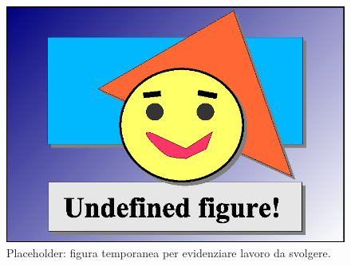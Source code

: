 


\begin{figure}[!hbp]
\begin{center}
\includegraphics{images/placeholder.eps}
\caption[~placeholder]{Placeholder: figura temporanea per
evidenziare lavoro da svolgere.} \label{fig:placeholder}
\end{center}
\end{figure}

